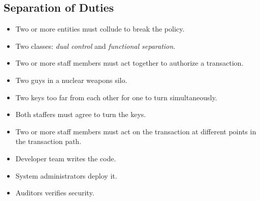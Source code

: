 \subsection{Separation of Duties}

\begin{frame}
  \begin{definition}
    \begin{itemize}
      \item Two or more entities must collude to break the policy.
      \item Two classes: \emph{dual control} and \emph{functional separation}.
    \end{itemize}
  \end{definition}
\end{frame}

\begin{frame}
  \begin{example}
    \begin{itemize}
      \item Two or more staff members must act together to authorize 
        a transaction.
    \end{itemize}
  \end{example}

  \pause{}

  \begin{example}
    \begin{itemize}
      \item Two guys in a nuclear weapons silo.
      \item Two keys too far from each other for one to turn simultaneously.
      \item Both staffers must agree to turn the keys.
    \end{itemize}
  \end{example}
\end{frame}

\begin{frame}
  \begin{example}
    \begin{itemize}
      \item Two or more staff members must act on the transaction at different 
        points in the transaction path.
    \end{itemize}
  \end{example}
  
  \pause{}

  \begin{example}
    \begin{itemize}
      \item Developer team writes the code.
      \item System administrators deploy it.
      \item Auditors verifies security.
    \end{itemize}
  \end{example}
\end{frame}

